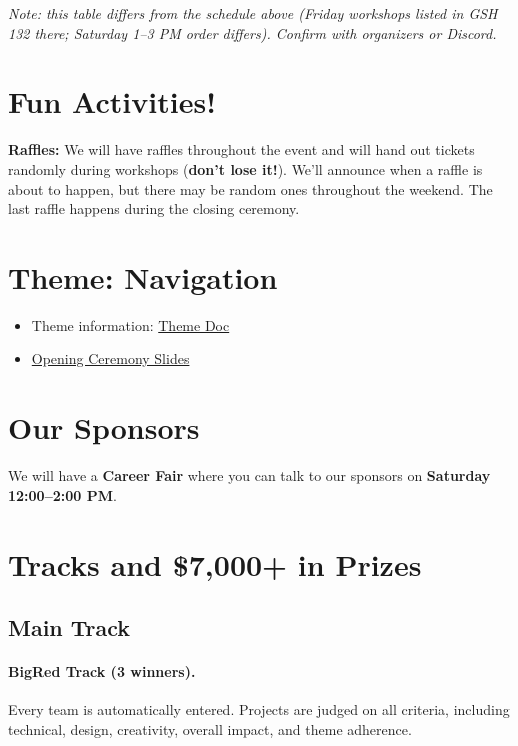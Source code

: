 \documentclass[11pt]{article}
\newcommand{\important}[1]{\textbf{\color{bigred}#1}}
\begin{document}
\noindent\emph{Note: this table differs from the schedule above (Friday
workshops listed in GSH 132 there; Saturday 1--3 PM order differs). Confirm
with organizers or Discord.}

\section{Fun Activities!}
\textbf{Raffles:} We will have raffles throughout the event and will hand out
tickets randomly during workshops (\important{don't lose it!}). We'll announce
when a raffle is about to happen, but there may be random ones throughout the
weekend. The last raffle happens during the closing ceremony.

\section{Theme: Navigation}
\begin{itemize}
  \item Theme information:
        \href{https://docs.google.com/document/d/1NHrE-zrTy1DDI-0d1FkQAStY7yizpfoao3BqESUHHM0/edit?usp=sharing}{Theme Doc}
  \item \href{https://docs.google.com/presentation/d/1HytL8PP48KtWOhP_aJ7BdhmIkyhY8bUU2go4iSU_tO0/edit?usp=sharing}{Opening Ceremony Slides}
\end{itemize}

\section{Our Sponsors}
We will have a \textbf{Career Fair} where you can talk to our sponsors on
\textbf{Saturday 12:00--2:00 PM}.

\section{Tracks and \$7{,}000+ in Prizes}

\subsection{Main Track}
\paragraph{BigRed Track (3 winners).}
Every team is automatically entered. Projects are judged on all criteria,
including technical, design, creativity, overall impact, and theme adherence.
\end{document}
